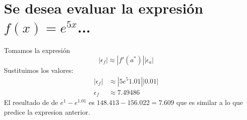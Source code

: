 \documentclass{article}
\begin{document}
\section{Se desea evaluar la expresión $f(x)=e^{5x}$...}
Tomamos la expresión
\begin{equation}
    |\epsilon_f| \approx |f'(a^*)||\epsilon_a|
\end{equation}
Sustituimos los valores:
\begin{equation}
\begin{aligned}    
    |\epsilon_f| &  \approx  |5e^5{1.01}||0.01| \\
    \epsilon_f & \approx  7.49486
\end{aligned}   
\end{equation}
El resultado de de $e^{1} - e^{1.01}$ es $148.413 - 156.022 = 7.609$ que es similar a lo que predice la expresion anterior.
\end{document}
